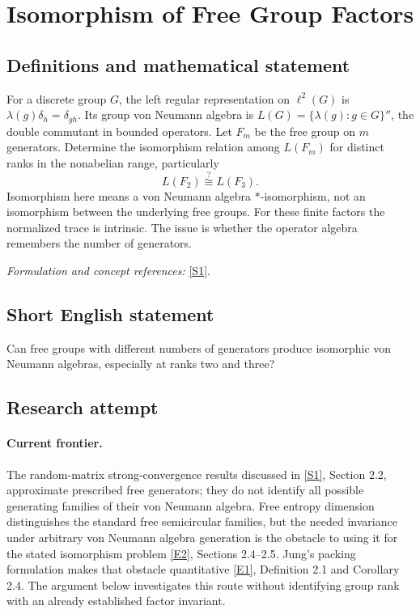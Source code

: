 \documentclass[11pt,a4paper]{article}
\newcommand{\sref}[2]{\hyperlink{source:#1:#2}{[S#2]}}
\newcommand{\eref}[2]{\hyperlink{extra:#1:#2}{[E#2]}}
\newif\ifshowcatalogue
\newcommand{\cataloguescope}[1]{\ifshowcatalogue
 \paragraph{Exact scope in the supplied catalogue.}
 \begin{quote}\small #1\end{quote}\fi}
\numberwithin{equation}{section}
\begin{document}
\setcounter{section}{0}
\clearpage
\section*{\texorpdfstring{Isomorphism of Free Group Factors}{Isomorphism of Free Group Factors}}\label{statement}
\subsection{Definitions and mathematical statement}
For a discrete group $G$, the left regular representation on $\ell^2(G)$ is $\lambda(g)\delta_h=\delta_{gh}$. Its group von Neumann algebra is
$L(G)=\{\lambda(g):g\in G\}''$, the double commutant in bounded operators. Let $F_m$ be the free group on $m$ generators. Determine the isomorphism relation among $L(F_m)$ for distinct ranks in the nonabelian range, particularly
\[
 L(F_2)\stackrel{?}{\cong}L(F_3).
\]
Isomorphism here means a von Neumann algebra $*$-isomorphism, not an isomorphism between the underlying free groups. For these finite factors the normalized trace is intrinsic. The issue is whether the operator algebra remembers the number of generators.
\par\smallskip\textit{Formulation and concept references:} \sref{statement}{1}.
\cataloguescope{Determine whether L(F\_m) and L(F\_n) are isomorphic when m != n, especially whether L(F\_2) is isomorphic to L(F\_3).}
\subsection{Short English statement}
Can free groups with different numbers of generators produce isomorphic von Neumann algebras, especially at ranks two and three?
\subsection{Research attempt}

\paragraph{Current frontier.}
The random-matrix strong-convergence results discussed in \sref{statement}{1},
Section 2.2, approximate prescribed free generators; they do not identify
all possible generating families of their von Neumann algebra. Free entropy
dimension distinguishes the standard free semicircular families, but the
needed invariance under arbitrary von Neumann algebra generation is the
obstacle to using it for the stated isomorphism problem
\eref{statement}{2}, Sections 2.4--2.5. Jung's packing formulation makes that
obstacle quantitative \eref{statement}{1}, Definition 2.1 and Corollary 2.4.
The argument below investigates this route without identifying group rank
with an already established factor invariant.
\end{document}
